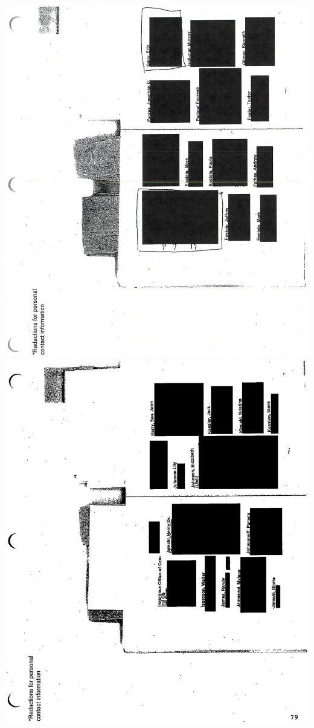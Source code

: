 \documentclass[10pt]{article}
\begin{document}
\includegraphics[max width=\textwidth, center]{2025_02_27_dd68c3d38de88f0516d9g-194}\\
\includegraphics[max width=\textwidth, center]{2025_02_27_dd68c3d38de88f0516d9g-196}\\
\end{document}
